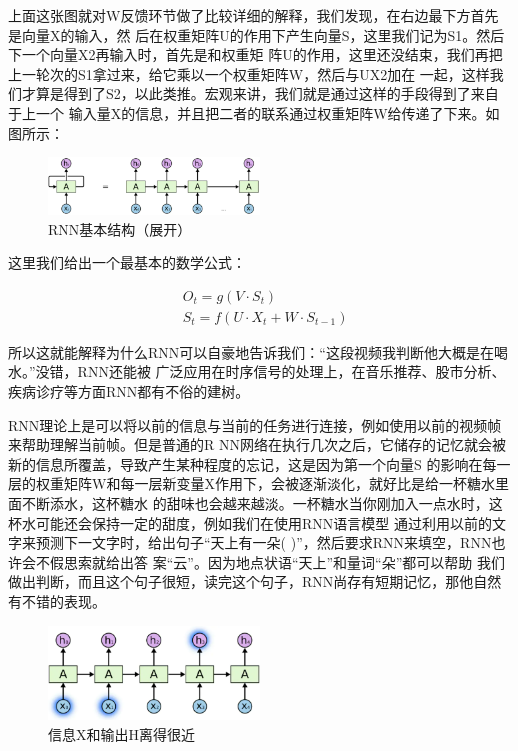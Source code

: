 \documentclass[11pt,a4paper]{elegantpaper}
\begin{document}
\begin{multicols}{2}
上面这张图就对W反馈环节做了比较详细的解释，我们发现，在右边最下方首先是向量X的输入，然
后在权重矩阵U的作用下产生向量S，这里我们记为S1。然后下一个向量X2再输入时，首先是和权重矩
阵U的作用，这里还没结束，我们再把上一轮次的S1拿过来，给它乘以一个权重矩阵W，然后与UX2加在
一起，这样我们才算是得到了S2，以此类推。宏观来讲，我们就是通过这样的手段得到了来自于上一个
输入量X的信息，并且把二者的联系通过权重矩阵W给传递了下来。如图所示：

\begin{figure}[H]
  \centering
  \includegraphics[width=0.5\textwidth]{images/WWW.png}
  \caption{RNN基本结构（展开）} 
\end{figure}

这里我们给出一个最基本的数学公式：


$$
\begin{aligned}
&O_{t}=g\left(V \cdot S_{t}\right) \\
&S_{t}=f\left(U \cdot X_{t}+W \cdot S_{t-1}\right)
\end{aligned}
$$

所以这就能解释为什么RNN可以自豪地告诉我们：“这段视频我判断他大概是在喝水。”没错，RNN还能被
广泛应用在时序信号的处理上，在音乐推荐、股市分析、疾病诊疗等方面RNN都有不俗的建树。

RNN理论上是可以将以前的信息与当前的任务进行连接，例如使用以前的视频帧来帮助理解当前帧。但是普通的R
NN网络在执行几次之后，它储存的记忆就会被新的信息所覆盖，导致产生某种程度的忘记，这是因为第一个向量S
的影响在每一层的权重矩阵W和每一层新变量X作用下，会被逐渐淡化，就好比是给一杯糖水里面不断添水，这杯糖水
的甜味也会越来越淡。一杯糖水当你刚加入一点水时，这杯水可能还会保持一定的甜度，例如我们在使用RNN语言模型
通过利用以前的文字来预测下一文字时，给出句子“天上有一朵(   )”，然后要求RNN来填空，RNN也许会不假思索就给出答
案“云”。因为地点状语“天上”和量词“朵”都可以帮助
我们做出判断，而且这个句子很短，读完这个句子，RNN尚存有短期记忆，那他自然有不错的表现。


\begin{figure}[H]
  \centering
  \includegraphics[width=0.5\textwidth]{images/XH.png}
  \caption{信息X和输出H离得很近} 
\end{figure}


\end{multicols}
\end{document}
